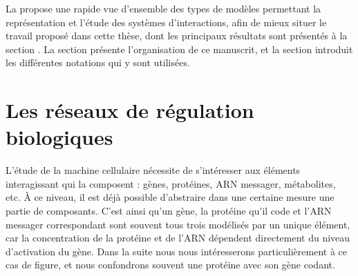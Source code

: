 

La  propose une rapide vue d'ensemble des types de modèles permettant
la représentation et l'étude des systèmes d'interactions,
afin de mieux situer le travail proposé dans cette thèse,
dont les principaux résultats sont présentés à la section .
La section  présente l'organisation de ce manuscrit,
et la section  introduit les différentes notations qui y sont utilisées.



\section{Les réseaux de régulation biologiques}


\stodo{[Thomas'73], [Paulevé'11 et '12]}

L'étude de la machine cellulaire nécessite de s'intéresser aux éléments interagissant
qui la composent :
gènes, protéines, ARN messager, métabolites, etc.
% 
À ce niveau, il est déjà possible d'abstraire dans une certaine mesure
une partie de composants.
C'est ainsi qu'un gène, la protéine qu'il code et l'ARN messager correspondant sont
souvent tous trois modélisés par un unique élément,
car la concentration de la protéine et de l'ARN
dépendent directement du niveau d'activation du gène.
Dans la suite nous nous intéresserons particulièrement à ce cas de figure,
et nous confondrons souvent une protéine avec son gène codant.

